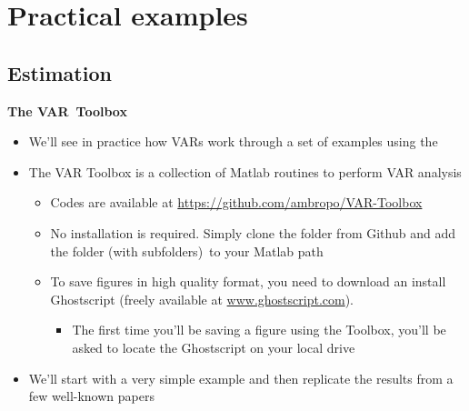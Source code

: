 \documentclass[10pt,english,t,aspectratio=169,ignorenonframetext]{beamer}
\begin{document}

\section{Practical examples}

\begin{frame}
\vspace{3cm}\color{title} 
\end{frame}


\subsection{Estimation}

\begin{frame}
{\textbf{The VAR\ Toolbox}}\bigskip \medskip

\begin{itemize}
\item We'll see in practice how VARs work through a set of examples using
the {}%
\bigskip 
{}

\item The VAR Toolbox is a collection of Matlab routines to perform VAR
analysis\smallskip

\begin{itemize}
\item Codes are available at \url{https://github.com/ambropo/VAR-Toolbox}%
\medskip

\item No installation is required. Simply clone the folder from Github and
add the folder (with subfolders)\ to your Matlab path\medskip

\item To save figures in high quality format, you need to download an
install Ghostscript (freely available at \url{www.ghostscript.com}).

\begin{itemize}
\item The first time you'll be saving a figure using the Toolbox, you'll be
asked to locate the Ghostscript on your local drive\bigskip
\end{itemize}
\end{itemize}

\item We'll start with a very simple example and then replicate the results
from a few well-known papers
\end{itemize}
\end{frame}
\end{document}
